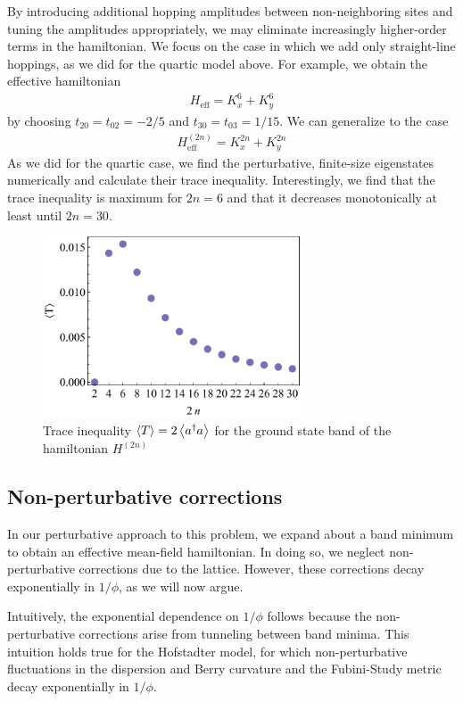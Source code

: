 \documentclass[aps,prb,twocolumn,letterpaper,twoside,nobalancelastpage,groupedaddress,amsmath,amssymb,floatfix,citeautoscript]{revtex4-1}
\begin{document}
By introducing additional hopping amplitudes between non-neighboring sites and tuning the amplitudes appropriately, we may eliminate increasingly higher-order terms in the hamiltonian. We focus on the case in which we add only straight-line hoppings, as we did for the quartic model above. For example, we obtain the effective hamiltonian
\begin{align*}
H_{\text{eff}} = K_x^6 + K_y^6
\end{align*}
by choosing $t_{20}=t_{02}=-2/5$ and $t_{30}=t_{03}=1/15$. We can generalize to the case
\begin{align*}
H^{(2n)}_{\text{eff}} = K_x^{2n} + K_y^{2n}
\end{align*}
As we did for the quartic case, we find the  perturbative, finite-size eigenstates numerically and calculate their trace inequality. Interestingly, we find that the trace inequality is maximum for $2n=6$ and that it decreases monotonically at least until $2n=30$.
\begin{figure}[thb]
\centering
\includegraphics[width=3.0in]{tr-v-2n.pdf}
\caption{Trace inequality $\expval{T} = 2 \expval{a^{\dag} a}$ for the ground state band of the hamiltonian $H^{(2n)}$}
\end{figure}

\subsection{Non-perturbative corrections}
In our perturbative approach to this problem, we expand about a band minimum to obtain an effective mean-field hamiltonian. In doing so, we neglect non-perturbative corrections due to the lattice. However, these corrections decay exponentially in $1/\phi$, as we will now argue.

Intuitively, the exponential dependence on $1/\phi$ follows because the non-perturbative corrections arise from tunneling between band minima. This intuition holds true for the Hofstadter model, for which non-perturbative fluctuations in the dispersion and Berry curvature and the Fubini-Study metric decay exponentially in $1/\phi$. 
\end{document}
